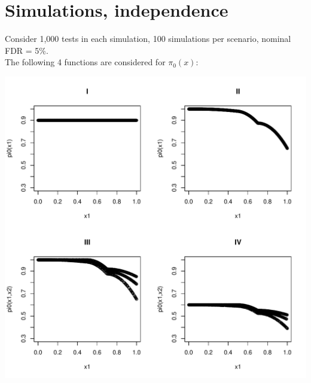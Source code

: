 \documentclass{article}\usepackage[]{graphicx}\usepackage[]{color}
\makeatletter
\def\maxwidth{ %
  \ifdim\Gin@nat@width>\linewidth
    \linewidth
  \else
    \Gin@nat@width
  \fi
}
\newenvironment{knitrout}{}{} %
\makeatother
\begin{document}
\section*{Simulations, independence}

Consider 1,000 tests in each simulation, 100 simulations per scenario, nominal FDR = 5\%.
\\
The following 4 functions are considered for $\pi_0(x)$:
\begin{knitrout}
\color{fgcolor}

{\centering \includegraphics[width=\maxwidth]{Figures/unnamed-chunk-3-1} 

}



\end{knitrout}

\clearpage
\end{document}
